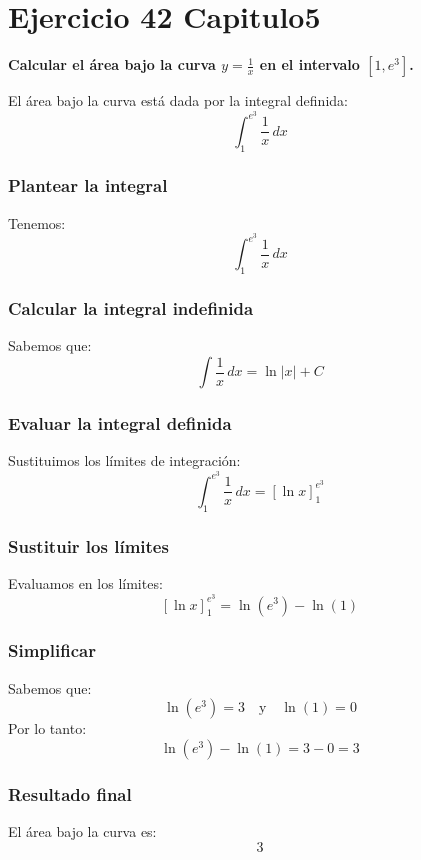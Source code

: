 \chapter*{Ejercicio 42 Capitulo5}
\textbf{Calcular el área bajo la curva \( y = \frac{1}{x} \) en el intervalo \([1, e^3]\).}

El área bajo la curva está dada por la integral definida:
\[
\int_{1}^{e^3} \frac{1}{x} \, dx
\]

\subsection*{Plantear la integral}
Tenemos:
\[
\int_{1}^{e^3} \frac{1}{x} \, dx
\]

\subsection*{Calcular la integral indefinida}
Sabemos que:
\[
\int \frac{1}{x} \, dx = \ln|x| + C
\]

\subsection*{Evaluar la integral definida}
Sustituimos los límites de integración:
\[
\int_{1}^{e^3} \frac{1}{x} \, dx = \left[ \ln x \right]_{1}^{e^3}
\]

\subsection*{Sustituir los límites}
Evaluamos en los límites:
\[
\left[ \ln x \right]_{1}^{e^3} = \ln(e^3) - \ln(1)
\]

\subsection*{Simplificar}
Sabemos que:
\[
\ln(e^3) = 3 \quad \text{y} \quad \ln(1) = 0
\]
Por lo tanto:
\[
\ln(e^3) - \ln(1) = 3 - 0 = 3
\]

\subsection*{Resultado final}
El área bajo la curva es:
\[
\boxed{3}
\]
\newpage
